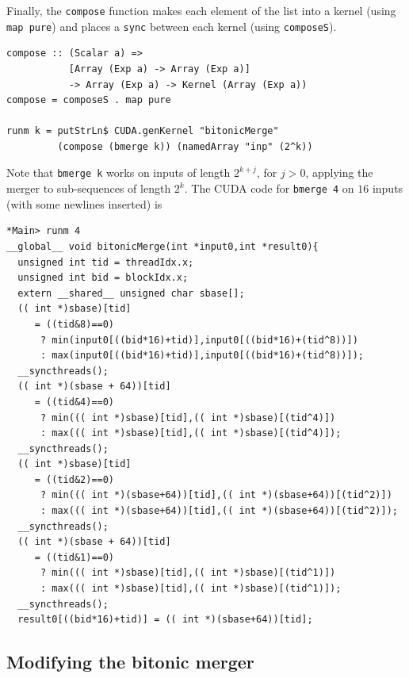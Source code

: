 \documentclass[]{sigplanconf}
\begin{document}
\noindent
Finally, the {\tt compose} function makes each element of the list
into a kernel (using {\tt map pure}) and places a {\tt sync} between
each kernel (using {\tt composeS}).
\begin{codesize}
\begin{verbatim}
compose :: (Scalar a) => 
           [Array (Exp a) -> Array (Exp a)] 
           -> Array (Exp a) -> Kernel (Array (Exp a))
compose = composeS . map pure

runm k = putStrLn$ CUDA.genKernel "bitonicMerge" 
         (compose (bmerge k)) (namedArray "inp" (2^k))
\end{verbatim}
\end{codesize}
\noindent
Note that {\tt bmerge k} works on inputs of length {\small }$2^{k+j}$, for $j > 0$, applying the merger to sub-sequences of length {\small $2^k$}.
The CUDA code for {\tt bmerge 4} on $16$ inputs
(with some newlines inserted) is
\begin{codesize}
\begin{verbatim}
*Main> runm 4
__global__ void bitonicMerge(int *input0,int *result0){
  unsigned int tid = threadIdx.x;
  unsigned int bid = blockIdx.x;
  extern __shared__ unsigned char sbase[];
  (( int *)sbase)[tid] 
     = ((tid&8)==0) 
      ? min(input0[((bid*16)+tid)],input0[((bid*16)+(tid^8))]) 
      : max(input0[((bid*16)+tid)],input0[((bid*16)+(tid^8))]);
  __syncthreads();
  (( int *)(sbase + 64))[tid] 
     = ((tid&4)==0) 
      ? min((( int *)sbase)[tid],(( int *)sbase)[(tid^4)]) 
      : max((( int *)sbase)[tid],(( int *)sbase)[(tid^4)]);
  __syncthreads();
  (( int *)sbase)[tid] 
     = ((tid&2)==0) 
      ? min((( int *)(sbase+64))[tid],(( int *)(sbase+64))[(tid^2)]) 
      : max((( int *)(sbase+64))[tid],(( int *)(sbase+64))[(tid^2)]);
  __syncthreads();
  (( int *)(sbase + 64))[tid] 
     = ((tid&1)==0) 
      ? min((( int *)sbase)[tid],(( int *)sbase)[(tid^1)]) 
      : max((( int *)sbase)[tid],(( int *)sbase)[(tid^1)]);
  __syncthreads();
  result0[((bid*16)+tid)] = (( int *)(sbase+64))[tid];
\end{verbatim}
\end{codesize}


\subsection{Modifying the bitonic merger}
\end{document}
